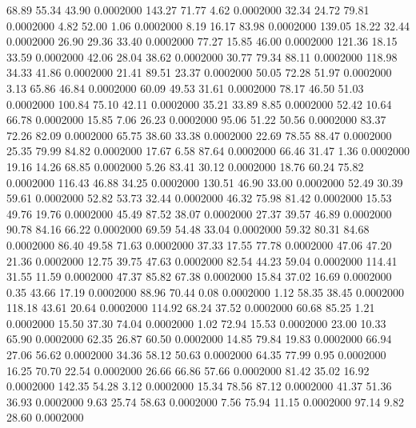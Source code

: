   68.89   55.34   43.90   0.0002000
 143.27   71.77    4.62   0.0002000
  32.34   24.72   79.81   0.0002000
   4.82   52.00    1.06   0.0002000
   8.19   16.17   83.98   0.0002000
 139.05   18.22   32.44   0.0002000
  26.90   29.36   33.40   0.0002000
  77.27   15.85   46.00   0.0002000
 121.36   18.15   33.59   0.0002000
  42.06   28.04   38.62   0.0002000
  30.77   79.34   88.11   0.0002000
 118.98   34.33   41.86   0.0002000
  21.41   89.51   23.37   0.0002000
  50.05   72.28   51.97   0.0002000
   3.13   65.86   46.84   0.0002000
  60.09   49.53   31.61   0.0002000
  78.17   46.50   51.03   0.0002000
 100.84   75.10   42.11   0.0002000
  35.21   33.89    8.85   0.0002000
  52.42   10.64   66.78   0.0002000
  15.85    7.06   26.23   0.0002000
  95.06   51.22   50.56   0.0002000
  83.37   72.26   82.09   0.0002000
  65.75   38.60   33.38   0.0002000
  22.69   78.55   88.47   0.0002000
  25.35   79.99   84.82   0.0002000
  17.67    6.58   87.64   0.0002000
  66.46   31.47    1.36   0.0002000
  19.16   14.26   68.85   0.0002000
   5.26   83.41   30.12   0.0002000
  18.76   60.24   75.82   0.0002000
 116.43   46.88   34.25   0.0002000
 130.51   46.90   33.00   0.0002000
  52.49   30.39   59.61   0.0002000
  52.82   53.73   32.44   0.0002000
  46.32   75.98   81.42   0.0002000
  15.53   49.76   19.76   0.0002000
  45.49   87.52   38.07   0.0002000
  27.37   39.57   46.89   0.0002000
  90.78   84.16   66.22   0.0002000
  69.59   54.48   33.04   0.0002000
  59.32   80.31   84.68   0.0002000
  86.40   49.58   71.63   0.0002000
  37.33   17.55   77.78   0.0002000
  47.06   47.20   21.36   0.0002000
  12.75   39.75   47.63   0.0002000
  82.54   44.23   59.04   0.0002000
 114.41   31.55   11.59   0.0002000
  47.37   85.82   67.38   0.0002000
  15.84   37.02   16.69   0.0002000
   0.35   43.66   17.19   0.0002000
  88.96   70.44    0.08   0.0002000
   1.12   58.35   38.45   0.0002000
 118.18   43.61   20.64   0.0002000
 114.92   68.24   37.52   0.0002000
  60.68   85.25    1.21   0.0002000
  15.50   37.30   74.04   0.0002000
   1.02   72.94   15.53   0.0002000
  23.00   10.33   65.90   0.0002000
  62.35   26.87   60.50   0.0002000
  14.85   79.84   19.83   0.0002000
  66.94   27.06   56.62   0.0002000
  34.36   58.12   50.63   0.0002000
  64.35   77.99    0.95   0.0002000
  16.25   70.70   22.54   0.0002000
  26.66   66.86   57.66   0.0002000
  81.42   35.02   16.92   0.0002000
 142.35   54.28    3.12   0.0002000
  15.34   78.56   87.12   0.0002000
  41.37   51.36   36.93   0.0002000
   9.63   25.74   58.63   0.0002000
   7.56   75.94   11.15   0.0002000
  97.14    9.82   28.60   0.0002000
